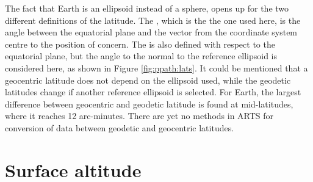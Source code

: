 The fact that Earth is an ellipsoid instead of a sphere, opens up
for the two different definitions of the latitude. The
, which is the the one used here, is the
angle between the equatorial plane and the vector from the coordinate
system centre to the position of concern. The  is also defined with respect to the equatorial plane, but
the angle to the normal to the reference ellipsoid is considered here, as
shown in Figure \ref{fig:ppath:lats}. It could be mentioned that a
geocentric latitude does not depend on the ellipsoid used, while
the geodetic latitudes change if another reference ellipsoid is
selected. 
For Earth, the largest difference between geocentric and geodetic latitude is
found at mid-latitudes, where it reaches 12 arc-minutes.
There are yet no methods in ARTS for conversion of data between geodetic and
geocentric latitudes.







\section{Surface altitude}

